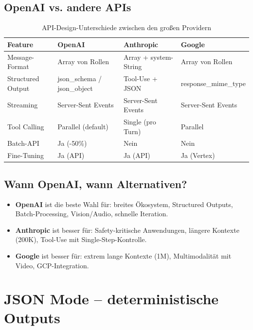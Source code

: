 \subsection{OpenAI vs. andere APIs}

\begin{table}[H]
\centering
\begin{tabularx}{\linewidth}{lXXX}
\toprule
\textbf{Feature} & \textbf{OpenAI} & \textbf{Anthropic} & \textbf{Google} \\
\midrule
Message-Format & Array von Rollen & Array + system-String & Array von Rollen \\
Structured Output & json\_schema / json\_object & Tool-Use + JSON & response\_mime\_type \\
Streaming & Server-Sent Events & Server-Sent Events & Server-Sent Events \\
Tool Calling & Parallel (default) & Single (pro Turn) & Parallel \\
Batch-API & Ja (-50\%) & Nein & Nein \\
Fine-Tuning & Ja (API) & Ja (API) & Ja (Vertex) \\
\bottomrule
\end{tabularx}
\caption{API-Design-Unterschiede zwischen den großen Providern}
\label{tab:api-compare}
\end{table}

\subsection{Wann OpenAI, wann Alternativen?}

\begin{itemize}[leftmargin=*]
    \item \textbf{OpenAI} ist die beste Wahl für: breites Ökosystem, Structured Outputs, Batch-Processing, Vision/Audio, schnelle Iteration.
    \item \textbf{Anthropic} ist besser für: Safety-kritische Anwendungen, längere Kontexte (200K), Tool-Use mit Single-Step-Kontrolle.
    \item \textbf{Google} ist besser für: extrem lange Kontexte (1M), Multimodalität mit Video, GCP-Integration.
\end{itemize}

\section{JSON Mode -- deterministische Outputs}

